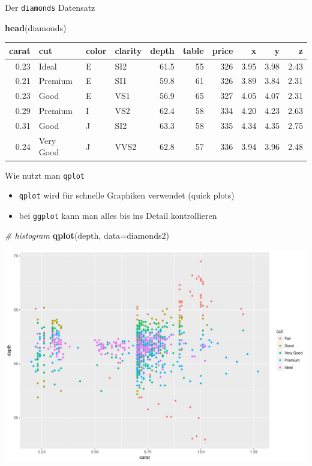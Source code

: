 \documentclass[ignorenonframetext,]{beamer}
\newenvironment{Shaded}{}{}
\newcommand{\KeywordTok}[1]{\textcolor[rgb]{0.00,0.44,0.13}{\textbf{{#1}}}}
\newcommand{\DataTypeTok}[1]{\textcolor[rgb]{0.56,0.13,0.00}{{#1}}}
\newcommand{\CommentTok}[1]{\textcolor[rgb]{0.38,0.63,0.69}{\textit{{#1}}}}
\newcommand{\NormalTok}[1]{{#1}}
\providecommand{\tightlist}{%
\setlength{\itemsep}{0pt}\setlength{\parskip}{0pt}}
\begin{document}
\begin{frame}[fragile]{Der \texttt{diamonds} Datensatz}

\begin{Shaded}
\begin{Highlighting}[]
\KeywordTok{head}\NormalTok{(diamonds)}
\end{Highlighting}
\end{Shaded}

\begin{longtable}[]{@{}rlllrrrrrr@{}}
\toprule
carat & cut & color & clarity & depth & table & price & x & y &
z\tabularnewline
\midrule
\endhead
0.23 & Ideal & E & SI2 & 61.5 & 55 & 326 & 3.95 & 3.98 &
2.43\tabularnewline
0.21 & Premium & E & SI1 & 59.8 & 61 & 326 & 3.89 & 3.84 &
2.31\tabularnewline
0.23 & Good & E & VS1 & 56.9 & 65 & 327 & 4.05 & 4.07 &
2.31\tabularnewline
0.29 & Premium & I & VS2 & 62.4 & 58 & 334 & 4.20 & 4.23 &
2.63\tabularnewline
0.31 & Good & J & SI2 & 63.3 & 58 & 335 & 4.34 & 4.35 &
2.75\tabularnewline
0.24 & Very Good & J & VVS2 & 62.8 & 57 & 336 & 3.94 & 3.96 &
2.48\tabularnewline
\bottomrule
\end{longtable}

\end{frame}

\begin{frame}[fragile]{Wie nutzt man \texttt{qplot}}

\begin{itemize}
\tightlist
\item
  \texttt{qplot} wird für schnelle Graphiken verwendet (quick plots)
\item
  bei \texttt{ggplot} kann man alles bis ins Detail kontrollieren
\end{itemize}

\begin{Shaded}
\begin{Highlighting}[]
\CommentTok{# histogram}
\KeywordTok{qplot}\NormalTok{(depth, }\DataTypeTok{data=}\NormalTok{diamonds2)}
\end{Highlighting}
\end{Shaded}

\includegraphics{R_intern_files/figure-beamer/unnamed-chunk-242-1.pdf}

\end{frame}
\end{document}
